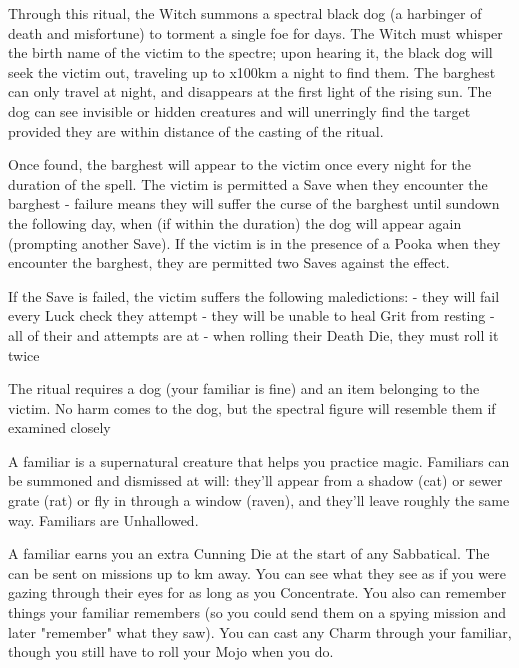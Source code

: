 {\OCCULT[
  Name=Barghest,
  Link=occultism-barghest,
  Success=4,
  Cost=See below,
  Widdershins=1
]

Through this ritual, the Witch summons a spectral black dog (a harbinger of death and misfortune) to torment a single foe for \LVL days.  The Witch must whisper the birth name of the victim to the spectre; upon hearing it, the black dog will seek the victim out, traveling up to \LVL x100km a night to find them.  The barghest can only travel at night, and disappears at the first light of the rising sun.  The dog can see invisible or hidden creatures and will unerringly find the target provided they are within distance of the casting of the ritual.

Once found, the barghest will appear to the victim once every night for the duration of the spell.  The victim is permitted a Save when they encounter the barghest - failure means they will suffer the curse of the barghest until sundown the following day, when (if within the duration) the dog will appear again (prompting another Save).  If the victim is in the presence of a Pooka when they encounter the barghest, they are permitted two Saves against the effect.

If the Save is failed, the victim suffers the following maledictions:
- they will fail every Luck check they attempt
- they will be unable to heal Grit from resting
- all of their \RO and \RB attempts are at \DCDOWN
- when rolling their Death Die, they must roll it twice

The ritual requires a dog (your familiar is fine) and an item belonging to the victim.  No harm comes to the dog, but the spectral figure will resemble them if examined closely


\OCCULT[
  Name=Bind Familiar,
  Link=occultism-bind-familiar,
  Success=1,
  Cost=666,
  Widdershins=1
]


A familiar is a supernatural creature that helps you practice magic.  Familiars can be summoned and dismissed at will: they'll appear from a shadow (cat) or sewer grate (rat) or fly in through a window (raven), and they'll leave roughly the same way.  Familiars are Unhallowed.

A familiar earns you an extra Cunning Die at the start of any Sabbatical.  The can be sent on missions up to \LVL km away.  You can see what they see as if you were gazing through their eyes for as long as you Concentrate. You also can remember things your familiar remembers (so you could send them on a spying mission and later "remember" what they saw). You can cast any Charm through your familiar, though you still have to roll your Mojo when you do.  

}
